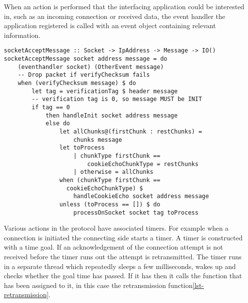 When an action is performed that the interfacing application could be interested in, such as an incoming connection or received data, the event handler the application registered is called with an event object containing relevant information.

\begin{lstlisting}[caption={socketAcceptMessage decides what to do with a message}]
socketAcceptMessage :: Socket -> IpAddress -> Message -> IO()
socketAcceptMessage socket address message = do
    (eventhandler socket) (OtherEvent message)
    -- Drop packet if verifyChecksum fails
    when (verifyChecksum message) $ do
        let tag = verificationTag $ header message
        -- verification tag is 0, so message MUST be INIT
        if tag == 0 
            then handleInit socket address message
            else do
                let allChunks@(firstChunk : restChunks) =
                    chunks message
                let toProcess
                    | chunkType firstChunk ==
                        cookieEchoChunkType = restChunks
                    | otherwise = allChunks
                when (chunkType firstChunk == 
                  cookieEchoChunkType) $
                    handleCookieEcho socket address message
                unless (toProcess == []) $ do
                    processOnSocket socket tag toProcess
\end{lstlisting}

Various actions in the protocol have associated timers. For example when a connection is initiated the connecting side starts a timer. A timer is constructed with a time goal. If an acknowledgement of the connection attempt is not received before the timer runs out the attempt is retransmitted.
The timer runs in a separate thread which repeatedly sleeps a few milliseconds, wakes up and checks whether the goal time has passed. If it has then it calls the function that has been assigned to it, in this case the retransmission function\ref{lst-retransmission}.

